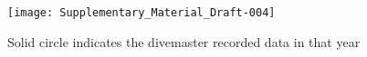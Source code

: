 \documentclass[a4paper]{article}
\begin{document}








%


\begin{figure}[h!]
\centering
\texttt{[image: Supplementary\_Material\_Draft-004]}
\caption{Solid circle indicates the divemaster recorded data in that year}
\end{figure}
\end{document}
